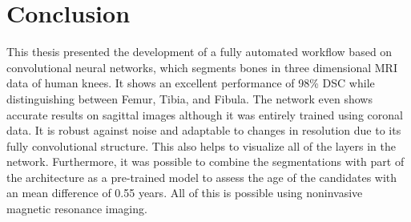 \section{Conclusion}

This thesis presented the development of a fully automated workflow based on convolutional neural networks, which segments bones in three dimensional MRI data of human knees. It shows an excellent performance of 98\% DSC while distinguishing between Femur, Tibia, and Fibula. The network even shows accurate results on sagittal images although it was entirely trained using coronal data. It is robust against noise and adaptable to changes in resolution due to its fully convolutional structure. This also helps to visualize all of the layers in the network. Furthermore, it was possible to combine the segmentations with part of the architecture as a pre-trained model to assess the age of the candidates with an mean difference of 0.55 years. All of this is possible using noninvasive magnetic resonance imaging.

\newpage